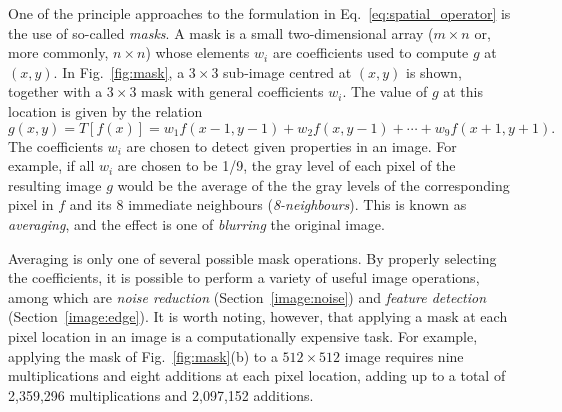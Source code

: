 
One of the principle approaches to the formulation in
Eq.~\ref{eq:spatial_operator} is the use of so-called {\em masks\/}.
A mask is a small two-dimensional array ($m\times n$ or, more
commonly, $n\times n$) whose elements $w_{i}$ are coefficients used to
compute $g$ at $(x,y)$.  In Fig.~\ref{fig:mask}, a $3\times 3$
sub-image centred at $(x,y)$ is shown, together with a $3\times 3$
mask with general coefficients $w_{i}$.  The value of $g$ at this
location is given by the relation
\begin{equation}
\label{eq:mask}
g(x,y)=T[f(x)]=w_{1}f(x-1,y-1)+w_{2}f(x,y-1)+\cdots+w_{9}f(x+1,y+1)\mbox{.}
\end{equation}
The coefficients $w_{i}$ are chosen to detect given properties in an
image.  For example, if all $w_{i}$ are chosen to be 1/9, the gray
level of each pixel of the resulting image $g$ would be the average of
the the gray levels of the corresponding pixel in $f$ and its 8
immediate neighbours ({\em 8-neighbours\/}).  This is known as {\em
  averaging\/}, and the effect is one of {\em blurring\/} the original
image.

Averaging is only one of several possible mask operations.  By
properly selecting the coefficients, it is possible to perform a
variety of useful image operations, among which are {\em noise
  reduction\/} (Section~\ref{image:noise}) and {\em feature
  detection\/} (Section~\ref{image:edge}).  It is worth noting,
however, that applying a mask at each pixel location in an image is a
computationally expensive task.  For example, applying the mask of
Fig.~\ref{fig:mask}(b) to a $512\times 512$ image requires nine
multiplications and eight additions at each pixel location, adding up
to a total of 2,359,296 multiplications and 2,097,152 additions.

